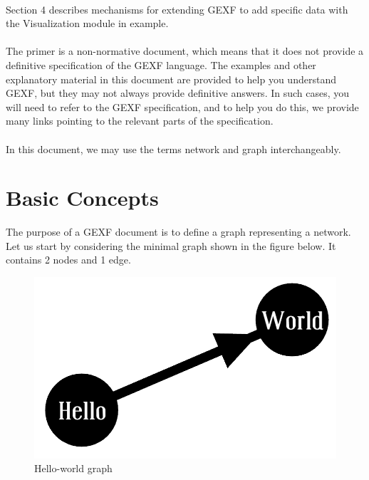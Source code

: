 \documentclass[a4paper,10pt]{article}
\begin{document}
\paragraph{}
Section 4 describes mechanisms for extending GEXF to add specific data with the Visualization module in example.

\paragraph{}
The primer is a non-normative document, which means that it does not provide a definitive specification of the GEXF language. The examples and other explanatory material in this document are provided to help you understand GEXF, but they may not always provide definitive answers. In such cases, you will need to refer to the GEXF specification, and to help you do this, we provide many links pointing to the relevant parts of the specification.

\paragraph{}
In this document, we may use the terms network and graph interchangeably.

\section{Basic Concepts} \label{basic}

The purpose of a GEXF document is to define a graph representing a network. Let us start by considering the minimal graph shown in the figure below. It contains 2 nodes and 1 edge.

\begin{figure}[!ht]
  \begin{center}
  \includegraphics[scale=0.15]{res/simple.png}
  \caption{Hello-world graph}
  \end{center}
\end{figure}
\end{document}
